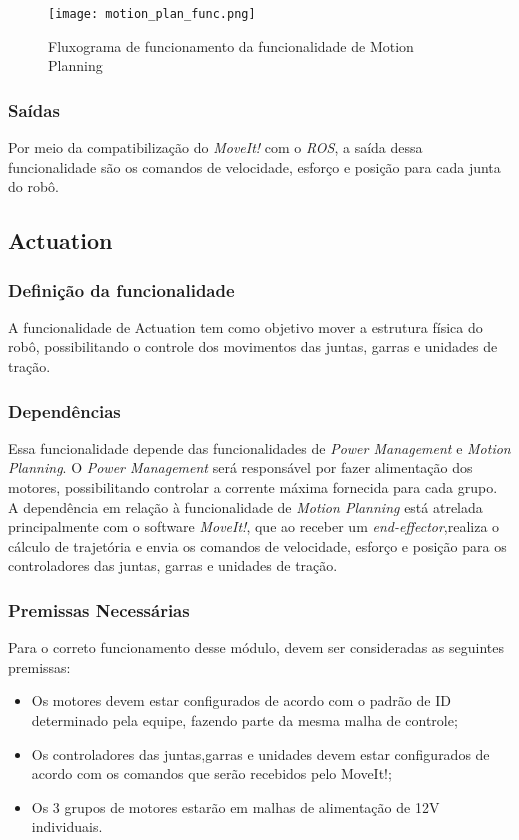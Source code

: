 \begin{figure}[H]
	\centering
	\texttt{[image: motion\_plan\_func.png]}
	\caption{Fluxograma de funcionamento da funcionalidade de Motion Planning}
	\label{fig:flux_motion}
\end{figure}

\subsubsection{Saídas}
Por meio da compatibilização do \textit{MoveIt!} com o \textit{ROS}, a saída dessa funcionalidade são os comandos de velocidade, esforço e posição para cada junta do robô.

\subsection{Actuation }
\label{ssec:actu}
\subsubsection{Definição da funcionalidade}
A funcionalidade de Actuation tem como objetivo mover a estrutura física do robô, possibilitando o controle dos movimentos das juntas, garras e unidades de tração.
\subsubsection{Dependências}
Essa funcionalidade depende das funcionalidades de \textit{Power Management} e \textit{Motion Planning}. O \textit{Power Management} será responsável por fazer alimentação dos motores, possibilitando controlar a corrente máxima fornecida para cada grupo.
A dependência em relação à funcionalidade de \textit{Motion Planning} está atrelada principalmente com o software \textit{MoveIt!}, que ao receber um \textit{end-effector},realiza o cálculo de trajetória e envia os comandos de velocidade, esforço e posição para os controladores das juntas, garras e unidades de tração.

\subsubsection{Premissas Necessárias}
Para o correto funcionamento desse módulo, devem ser consideradas as seguintes premissas:
\begin{itemize}
	\item Os motores devem estar configurados de acordo com o padrão de ID determinado pela equipe, fazendo parte da mesma malha de controle;
	\item Os controladores das juntas,garras e unidades devem estar configurados de acordo com os comandos que serão recebidos pelo MoveIt!;
	\item Os 3 grupos de motores estarão em malhas de alimentação de 12V individuais.
\end{itemize}
